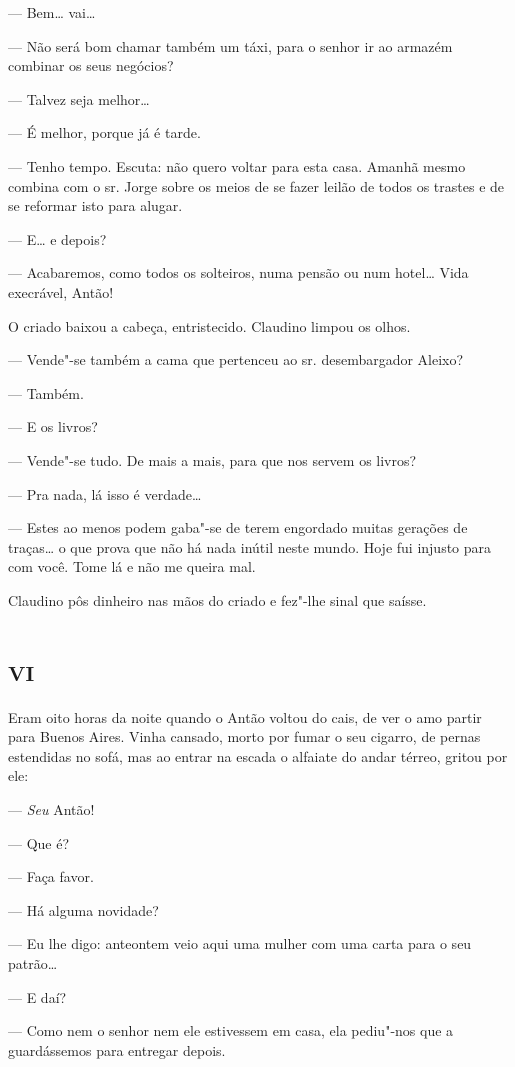 --- Bem\ldots{} vai\ldots{}

--- Não será bom chamar também um táxi, para o senhor ir ao armazém
combinar os seus negócios?

--- Talvez seja melhor\ldots{}

--- É melhor, porque já é tarde.

--- Tenho tempo. Escuta: não quero voltar para esta casa. Amanhã mesmo
combina com o sr. Jorge sobre os meios de se fazer leilão de todos os
trastes e de se reformar isto para alugar.

--- E\ldots{} e depois?

--- Acabaremos, como todos os solteiros, numa pensão ou num hotel\ldots{}
Vida execrável, Antão!

O criado baixou a cabeça, entristecido. Claudino limpou os olhos.

--- Vende"-se também a cama que pertenceu ao sr. desembargador Aleixo?

--- Também.

--- E os livros?

--- Vende"-se tudo. De mais a mais, para que nos servem os livros?

--- Pra nada, lá isso é verdade\ldots{}

--- Estes ao menos podem gaba"-se de terem engordado muitas gerações de
traças\ldots{} o que prova que não há nada inútil neste mundo. Hoje fui
injusto para com você. Tome lá e não me queira mal.

Claudino pôs dinheiro nas mãos do criado e fez"-lhe sinal que saísse.

\section{\textsc{vi}}

Eram oito horas da noite quando o Antão voltou do cais, de ver o amo
partir para Buenos Aires. Vinha cansado, morto por fumar o seu cigarro,
de pernas estendidas no sofá, mas ao entrar na escada o alfaiate do
andar térreo, gritou por ele:

--- \emph{Seu} Antão!

--- Que é?

--- Faça favor.

--- Há alguma novidade?

--- Eu lhe digo: anteontem veio aqui uma mulher com uma carta para o seu
patrão\ldots{}

--- E daí?

--- Como nem o senhor nem ele estivessem em casa, ela pediu"-nos que a
guardássemos para entregar depois.

